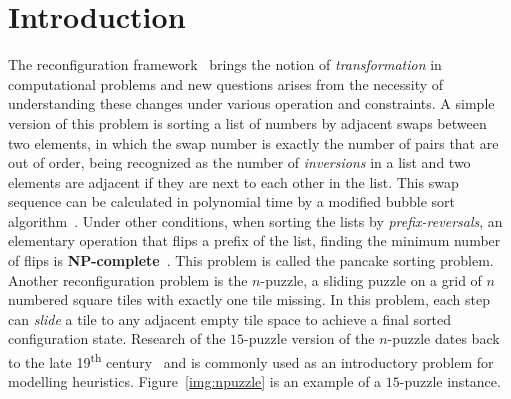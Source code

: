 \documentclass[msc,english,table,xcdraw]{ppgccufmg}
\begin{document}


\chapter{Introduction}
\label{chp:intro}

The reconfiguration framework~\citep{Ito:2011} brings the notion of 
\textit{transformation} in computational problems and new questions arises 
from the necessity of understanding these changes under various operation 
and constraints.
A simple version of this problem is sorting a list of numbers by adjacent swaps 
between two elements, in which the swap number is exactly the number of 
pairs that are out of order, being recognized as the number of \textit{
inversions} in a list and two elements are adjacent if they are next to each 
other in the list.
This swap sequence can be calculated in polynomial time by a modified bubble 
sort algorithm~\citep{Knuth:1998}.
Under other conditions, when sorting the lists by \textit{prefix-reversals}, 
an elementary operation that flips a prefix of the list, finding the 
minimum number of flips is \textbf{NP-complete}~\citep{Bulteau:2015}.
This problem is called the pancake sorting problem.
Another reconfiguration problem is the $n$-puzzle, a sliding puzzle on a 
grid of $n$ numbered square tiles with exactly one tile missing.
In this problem, each step can \textit{slide} a tile to any adjacent empty tile 
space to achieve a final sorted configuration state.
Research of the $15$-puzzle version of the $n$-puzzle dates back to the late 
19\textsuperscript{th} century~\citep{Johnson:1879} and is commonly used as an 
introductory problem for modelling heuristics.
Figure~\ref{img:npuzzle} is an example of a $15$-puzzle instance.
\end{document}

